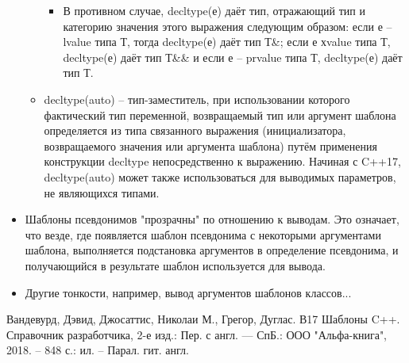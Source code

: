 \documentclass[a4paper,12pt]{article}	%
\begin{document}
\begin{itemize}
\begin{itemize}
\begin{itemize}
				\item В противном случае, decltype(е) даёт тип, отражающий тип и категорию значения этого выражения следующим образом: если е -- lvalue типа Т, тогда decltype(е) даёт тип Т\&; если е хvalue типа Т, decltype(е) даёт тип Т\&\& и если е -- prvalue типа Т, decltype(е) даёт тип Т.
		
			\end{itemize}

			\item decltype(auto) -- тип-заместитель, при использовании которого фактический тип переменной, возвращаемый тип или аргумент шаблона определяется из типа связанного выражения (инициализатора, возвращаемого значения или аргумента шаблона) путём применения конструкции decltype непосредственно к выражению. Начиная с C++17, decltype(auto) может также использоваться для выводимых параметров, не являющихся типами.
	
		\end{itemize}
	
		\item Шаблоны псевдонимов "прозрачны" по отношению к выводам.
Это означает, что везде, где появляется шаблон псевдонима с некоторыми аргументами шаблона, выполняется подстановка аргументов в определение псевдонима, и получающийся в результате шаблон используется для вывода.

		\item Другие тонкости, например, вывод аргументов шаблонов классов...
	
	\end{itemize}
	
\newpage


 
	\begin{thebibliography}{}
	
		 Вандевурд, Дэвид, Джосаттис, Николаи М., Грегор, Дуглас. В17 Шаблоны C++. Справочник разработчика, 2-е изд.: Пер. с англ. — СпБ.: ООО "Альфа-книга", 2018. -- 848 с.: ил. -- Парал. гит. англ.
		
	\end{thebibliography}
\end{document}
